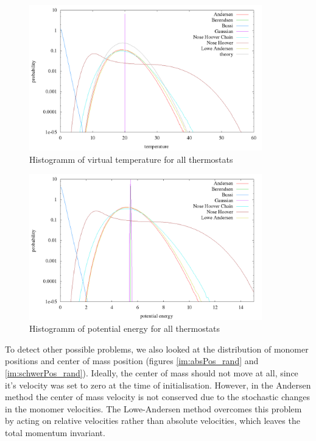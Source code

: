 \begin{figure}[H]
\centering
\includegraphics[width=0.9\textwidth]{./graphics/Histogramm_tempCol_rand_T=20_p=64.png}
\caption{Histogramm of virtual temperature for all thermostats}
\label{im:temp_rand}
\end{figure}

\begin{figure}[H]
\centering
\includegraphics[width=0.9\textwidth]{./graphics/Histogramm_epot_rand_T=20_p=64.png}
\caption{Histogramm of potential energy for all thermostats}
\label{im:epot_rand}
\end{figure}

To detect other possible problems, we also looked at the distribution of monomer positions and center of mass position (figures \ref{im:absPos_rand} and \ref{im:schwerPos_rand}). Ideally, the center of mass should not move at all, since it's velocity was set to zero at the time of initialisation. However, in the Andersen method the center of mass velocity is not conserved due to the stochastic changes in the monomer velocities. The Lowe-Andersen method overcomes this problem by acting on relative velocities rather than absolute velocities, which leaves the total momentum invariant.    

